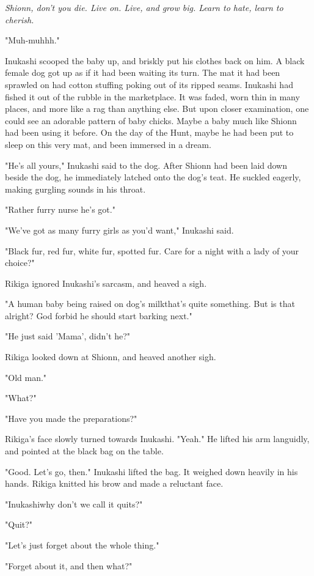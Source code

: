 \emph{Shionn, don't you die. Live on. Live, and grow big. Learn to hate, learn
to cherish.}

"Muh-muhhh."

Inukashi scooped the baby up, and briskly put his clothes back on him. A
black female dog got up as if it had been waiting its turn. The mat it
had been sprawled on had cotton stuffing poking out of its ripped seams.
Inukashi had fished it out of the rubble in the marketplace. It was
faded, worn thin in many places, and more like a rag than anything else.
But upon closer examination, one could see an adorable pattern of baby
chicks. Maybe a baby much like Shionn had been using it before. On the
day of the Hunt, maybe he had been put to sleep on this very mat, and
been immersed in a dream.

"He's all yours," Inukashi said to the dog. After Shionn had been laid
down beside the dog, he immediately latched onto the dog's teat. He
suckled eagerly, making gurgling sounds in his throat.

"Rather furry nurse he's got."

"We've got as many furry girls as you'd want," Inukashi said.~

"Black fur, red fur, white fur, spotted fur. Care for a night with a
lady of your choice?"

Rikiga ignored Inukashi's sarcasm, and heaved a sigh.

"A human baby being raised on dog's milk\el that's quite something. But
is that alright? God forbid he should start barking next."

"He just said 'Mama', didn't he?"

Rikiga looked down at Shionn, and heaved another sigh.

"Old man."

"What?"

"Have you made the preparations?"

Rikiga's face slowly turned towards Inukashi. "Yeah." He lifted his arm
languidly, and pointed at the black bag on the table.

"Good. Let's go, then." Inukashi lifted the bag. It weighed down heavily
in his hands. Rikiga knitted his brow and made a reluctant face.

"Inukashi\el why don't we call it quits?"

"Quit?"

"Let's just forget about the whole thing."

"Forget about it, and then what?"


